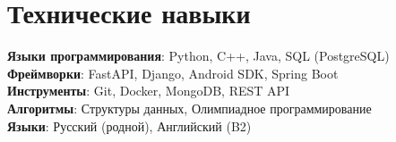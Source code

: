 \documentclass[letterpaper,11pt]{article}
\begin{document}
\section{Технические навыки}
 \begin{itemize}[leftmargin=0.15in, label={}]
    \small{\item{
     \textbf{Языки программирования}{: Python, C++, Java, SQL (PostgreSQL)} \\
     \textbf{Фреймворки}{: FastAPI, Django, Android SDK, Spring Boot} \\
     \textbf{Инструменты}{: Git, Docker, MongoDB, REST API} \\
     \textbf{Алгоритмы}{: Структуры данных, Олимпиадное программирование} \\
     \textbf{Языки}{: Русский (родной), Английский (B2)}
    }}
 \end{itemize}
\end{document}
